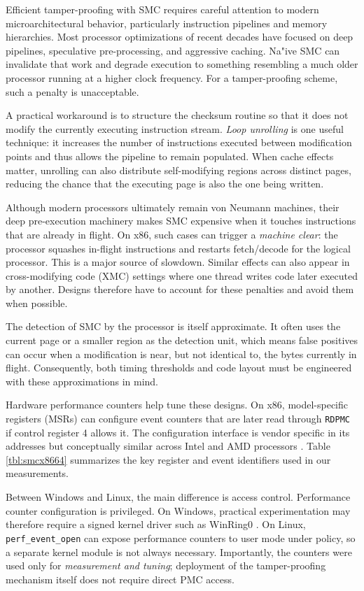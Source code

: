 \documentclass[11pt]{article}
\begin{document}
Efficient tamper-proofing with SMC requires careful attention to modern
microarchitectural behavior, particularly instruction pipelines and memory
hierarchies.  Most processor optimizations of recent decades have focused on deep
pipelines, speculative pre-processing, and aggressive caching.  Na"ive SMC can
invalidate that work and degrade execution to something resembling a much older
processor running at a higher clock frequency.  For a tamper-proofing scheme,
such a penalty is unacceptable.

A practical workaround is to structure the checksum routine so that it does not
modify the currently executing instruction stream.  \emph{Loop unrolling} is one
useful technique: it increases the number of instructions executed between
modification points and thus allows the pipeline to remain populated.  When cache
effects matter, unrolling can also distribute self-modifying regions across
distinct pages, reducing the chance that the executing page is also the one being
written.

Although modern processors ultimately remain von Neumann machines, their deep
pre-execution machinery makes SMC expensive when it touches instructions that are
already in flight.  On x86, such cases can trigger a \emph{machine clear}: the
processor squashes in-flight instructions and restarts fetch/decode for the
logical processor.  This is a major source of slowdown.  Similar effects can also
appear in cross-modifying code (XMC) settings where one thread writes code later
executed by another.  Designs therefore have to account for these penalties and
avoid them when possible.

The detection of SMC by the processor is itself approximate.  It often uses the
current page or a smaller region as the detection unit, which means false
positives can occur when a modification is near, but not identical to, the bytes
currently in flight.  Consequently, both timing thresholds and code layout must
be engineered with these approximations in mind.

Hardware performance counters help tune these designs.  On x86, model-specific
registers (MSRs) can configure event counters that are later read through
\texttt{RDPMC} if control register 4 allows it.  The configuration interface is
vendor specific in its addresses but conceptually similar across Intel and AMD
processors \cite{intel2016,amd2023}.  Table \ref{tbl:smcx8664} summarizes the key
register and event identifiers used in our measurements.

Between Windows and Linux, the main difference is access control.  Performance
counter configuration is privileged.  On Windows, practical experimentation may
therefore require a signed kernel driver such as WinRing0 \cite{openlibsysWhatapossWinRing0}.
On Linux, \lstinline|perf_event_open| can expose performance counters to user mode
under policy, so a separate kernel module is not always necessary.  Importantly,
the counters were used only for \emph{measurement and tuning}; deployment of the
tamper-proofing mechanism itself does not require direct PMC access.
\end{document}
